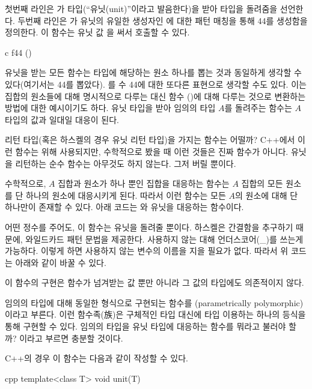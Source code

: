 첫번째 라인은 가 \code{()} 타입(``유닛(unit)''이라고 발음한다)을 받아  타입을 돌려줌을 선언한다.
두번째 라인은 가 유닛의 유일한 생성자인 \code{()}에 대한 패턴 매칭을 통해 44를 생성함을 정의한다. 이 함수는 유닛 값 \code{()}을 써서 호출할 수 있다.

\begin{snip}{c}
f44 ()
\end{snip}

유닛을 받는 모든 함수는 \trTarget 타입에 해당하는 원소 하나를 뽑는 것과 동일하게 생각할 수 있다(여기서는  44를 뽑았다).
를 수 44에 대한 또다른 표현으로 생각할 수도 있다. 이는 집합의 원소들에 대해 명시적으로 다루는 대신 함수 (\trArrow)에 대해 다루는 것으로 변환하는 방법에 대한 예시이기도 하다.
유닛 타입을 받아 임의의 타입 $A$를 돌려주는 함수는 $A$ 타입의 값과 일대일 대응이 된다.

 리턴 타입(혹은 하스켈의 경우 유닛 리턴 타입)을 가지는 함수는 어떨까?
C++에서 이런 함수는 \trSideEffect\를 위해 사용되지만, 수학적으로 봤을 때 이런 것들은 진짜 함수가 아니다.
유닛을 리턴하는 순수 함수는 아무것도 하지 않는다. 그저 \trArgument\를 버릴 뿐이다.

수학적으로, $A$ 집합과 원소가 하나 뿐인 집합을 대응하는 함수는 $A$ 집합의 모든 원소를 단 하나의 원소에 대응시키게 된다.
따라서 이런 함수는 모든 $A$의 원소에 대해 단 하나만이 존재할 수 있다. 아래 코드는 와 유닛을 대응하는 함수이다.

어떤 정수를 주어도, 이 함수는 유닛을 돌려줄 뿐이다. 하스켈은 간결함을 추구하기 때문에, 와일드카드 패턴 문법을 제공한다. 사용하지 않는  대해 언더스코어(\_)를 쓰는게 가능하다.
이렇게 하면 사용하지 않는 변수의 이름을 지을 필요가 없다. 따라서 위 코드는 아래와 같이 바꿀 수 있다.

이 함수의 구현은 함수가 넘겨받는 값 뿐만 아니라 그 값의 타입에도 의존적이지 않다.

임의의 타입에 대해 동일한 형식으로 구현되는 함수를 \trParameter\trPolymorphic(parametrically polymorphic)이라고 부른다.
이런 함수족(族)은 구체적인 타입 대신에 타입 \trParameter\를 이용하는 하나의 등식을 통해 구현할 수 있다.
임의의 타입을 유닛 타입에 대응하는 \trPolymorphic 함수를 뭐라고 불러야 할까?  이라고 부르면 충분할 것이다.


C++의 경우 이 함수는 다음과 같이 작성할 수 있다.

\begin{snip}{cpp}
template<class T>
void unit(T) {}
\end{snip}

